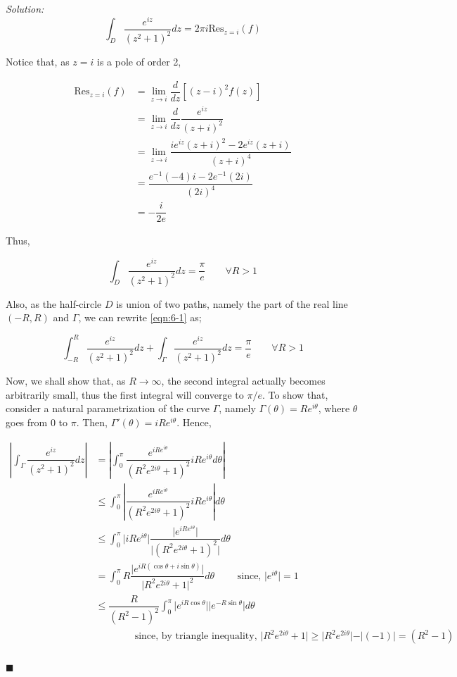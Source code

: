 \documentclass[12pt]{article}
\newcommand{\res}{\text{Res}}
\theoremstyle{definition}
\newenvironment{answer}{\textit{Solution: }\quad }{ \hfill $\blacksquare$}
\numberwithin{equation}{section}
\begin{document}
\begin{answer}
	$$
	\int_D \dfrac{e^{iz}}{(z^2 + 1)^2}dz = 2\pi i \res_{z = i}(f)
	$$

	Notice that, as $z = i$ is a pole of order 2,

	\begin{align*}
		\res_{z = i}(f)
		& = \lim_{z \rightarrow i} \dfrac{d}{dz} \left[ (z-i)^2 f(z)\right]\\
		& = \lim_{z \rightarrow i} \dfrac{d}{dz} \dfrac{e^{iz}}{(z+i)^2}\\
		& = \lim_{z \rightarrow i} \dfrac{ ie^{iz} (z+i)^2 - 2e^{iz}(z+i) }{(z + i)^4}\\
		& = \dfrac{e^{-1}(-4)i - 2e^{-1}(2i)}{(2i)^4}\\
		& = -\dfrac{i}{2e}  
	\end{align*}

	Thus, 

	\begin{equation}
		\int_D \dfrac{e^{iz}}{(z^2 + 1)^2}dz = \dfrac{\pi}{e}	\qquad \forall R > 1 \label{eqn:6-1}
	\end{equation}

	Also, as the half-circle $D$ is union of two paths, namely the part of the real line $(-R, R)$ and $\Gamma$, we can rewrite \cref{eqn:6-1} as;

	\begin{equation}
		\int_{-R}^{R} \dfrac{e^{iz}}{(z^2 + 1)^2}dz + \int_\Gamma \dfrac{e^{iz}}{(z^2 + 1)^2}dz = \dfrac{\pi}{e} \qquad \forall R > 1	
		\label{eqn:6-2}
	\end{equation}

	Now, we shall show that, as $R \rightarrow \infty$, the second integral actually becomes arbitrarily small, thus the first integral will converge to $\pi/e$. To show that, consider a natural parametrization of the curve $\Gamma$, namely $\Gamma(\theta) = Re^{i\theta}$, where $\theta$ goes from $0$ to $\pi$. Then, $\Gamma'(\theta) = iRe^{i\theta}$. Hence,

	\begin{align*}
		\left\vert \int_\Gamma \dfrac{e^{iz}}{(z^2 + 1)^2} dz \right\vert 
		& = \left\vert \int_{0}^{\pi} \dfrac{e^{iRe^{i\theta}}}{\left( R^2e^{2i\theta} + 1 \right)^2} iR e^{i\theta} d\theta \right\vert \\
		& \leq \int_{0}^{\pi} \left\vert \dfrac{e^{iRe^{i\theta}}}{\left( R^2e^{2i\theta} + 1 \right)^2} iR e^{i\theta} \right\vert d\theta\\
		& \leq \int_{0}^{\pi} \vert iR e^{i\theta} \vert \dfrac{\vert e^{iRe^{i\theta}} \vert }{\vert (R^2 e^{2i\theta} + 1)^2 \vert} d\theta\\
		& = \int_{0}^{\pi} R \dfrac{\vert e^{iR(\cos \theta + i\sin \theta)} \vert }{\vert R^2 e^{2i\theta} + 1 \vert^2} d\theta \qquad \text{ since, } \vert e^{i\theta} \vert = 1 \\
		& \leq \dfrac{R}{(R^2 - 1)^2} \int_{0}^{\pi} \vert e^{iR\cos \theta} \vert \vert e^{-R\sin \theta} \vert d\theta\\
		& \qquad \qquad \text{since, by triangle inequality, } \vert R^2 e^{2i\theta} + 1\vert \geq \vert R^2 e^{2i\theta} \vert - \vert (-1)\vert = (R^2 - 1)\\
	\end{align*}


\end{answer}
\end{document}
